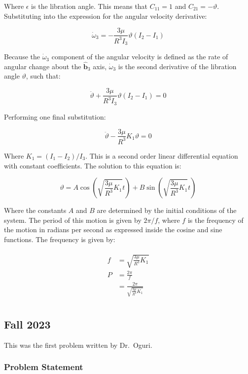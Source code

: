 \documentclass[
]{article}
\begin{document}
Where \(\epsilon\) is the libration angle. This means that
\(C_{11} = 1\) and \(C_{21} = -\vartheta\). Substituting into the
expression for the angular velocity derivative:

\[\dot{\omega}_3 = -\frac{3 \mu}{R^3 I_3} \vartheta \left(I_2 - I_1\right)\]

Because the \(\dot{\omega}_3\) component of the angular velocity is
defined as the rate of angular change about the
\(\hat{\boldsymbol{b}}_3\) axis, \(\dot{\omega}_3\) is the second
derivative of the libration angle \(\vartheta\), such that:

\[\ddot{\vartheta} + \frac{3 \mu}{R^3 I_3} \vartheta \left(I_2 - I_1\right) = 0\]

Performing one final substitution:

\[\ddot{\vartheta} - \frac{3 \mu}{R^3} K_1 \vartheta = 0\]

Where \(K_1 = (I_1 - I_2) / I_3\). This is a second order linear
differential equation with constant coefficients. The solution to this
equation is:

\[\vartheta = A \cos\left(\sqrt{\frac{3 \mu}{R^3} K_1} t\right) + B \sin\left(\sqrt{\frac{3 \mu}{R^3} K_1} t\right)\]

Where the constants \(A\) and \(B\) are determined by the initial
conditions of the system. The period of this motion is given by
\(2\pi / f\), where \(f\) is the frequency of the motion in radians per
second as expressed inside the cosine and sine functions. The frequency
is given by:

\[\begin{aligned}
\begin{aligned}
    f &= \sqrt{\frac{3 \mu}{R^3} K_1} \\
    P &= \frac{2\pi}{f} \\
    &= \frac{2\pi}{\sqrt{\frac{3 \mu}{R^3} K_1}} \\
\end{aligned}
\end{aligned}\]

\subsection{Fall 2023}\label{fall-2023-1}

This was the first problem written by Dr.~Oguri.

\subsubsection{Problem Statement}\label{problem-statement-1}
\end{document}
